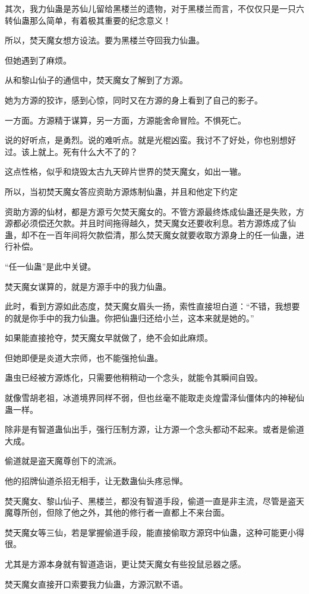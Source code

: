 \begin{this_body}
其次，我力仙蛊是苏仙儿留给黑楼兰的遗物，对于黑楼兰而言，不仅仅只是一只六转仙蛊那么简单，有着极其重要的纪念意义！

所以，焚天魔女想方设法。要为黑楼兰夺回我力仙蛊。

但她遇到了麻烦。

从和黎山仙子的通信中，焚天魔女了解到了方源。

她为方源的狡诈，感到心惊，同时又在方源的身上看到了自己的影子。

一方面。方源精于谋算，另一方面，方源能舍命冒险。不惧死亡。

说的好听点，是勇烈。说的难听点。就是光棍凶蛮。我讨不了好处，你也别想好过。该上就上。死有什么大不了的？

这点性格，似乎和烧毁太古九天碎片世界的焚天魔女，如出一辙。

所以，当初焚天魔女答应资助方源炼制仙蛊，并且和他定下约定

资助方源的仙材，都是方源亏欠焚天魔女的。不管方源最终炼成仙蛊还是失败，方源都必须偿还欠款。并且时间拖得越久，焚天魔女还要收利息。若方源炼成了仙蛊，却不在一百年间将欠款偿清，那么焚天魔女就要收取方源身上的任一仙蛊，进行补偿。

“任一仙蛊”是此中关键。

焚天魔女谋算的，就是方源手中的我力仙蛊。

此时，看到方源如此态度，焚天魔女眉头一扬，索性直接坦白道：“不错，我想要的就是你手中的我力仙蛊。你把仙蛊归还给小兰，这本来就是她的。”

如果能直接抢夺，焚天魔女早就做了，绝不会如此麻烦。

但她即便是炎道大宗师，也不能强抢仙蛊。

蛊虫已经被方源炼化，只需要他稍稍动一个念头，就能令其瞬间自毁。

就像雪胡老祖，冰道境界同样不弱，但也丝毫不能取走炎煌雷泽仙僵体内的神秘仙蛊一样。

除非是有智道蛊仙出手，强行压制方源，让方源一个念头都动不起来。或者是偷道大成。

偷道就是盗天魔尊创下的流派。

他的招牌仙道杀招无相手，让无数蛊仙头疼忌惮。

焚天魔女、黎山仙子、黑楼兰，都没有智道手段，偷道一直是非主流，尽管是盗天魔尊所创，但除了他之外，其他的修行者一直都上不来台面。

焚天魔女等三仙，若是掌握偷道手段，能直接偷取方源窍中仙蛊，这种可能更小得很。

尤其是方源本身就有智道造诣，更让焚天魔女有些投鼠忌器之感。

焚天魔女直接开口索要我力仙蛊，方源沉默不语。


\end{this_body}
